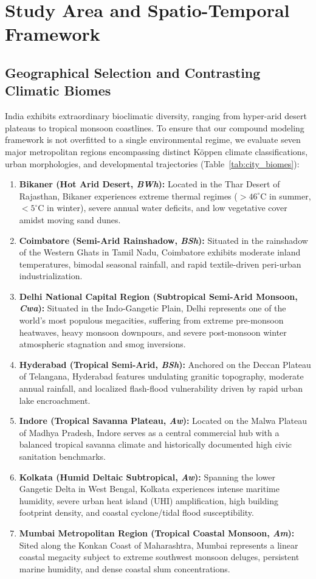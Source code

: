\section{Study Area and Spatio-Temporal Framework}
\label{sec:study_area}

\subsection{Geographical Selection and Contrasting Climatic Biomes}
India exhibits extraordinary bioclimatic diversity, ranging from hyper-arid desert plateaus to tropical monsoon coastlines. To ensure that our compound modeling framework is not overfitted to a single environmental regime, we evaluate seven major metropolitan regions encompassing distinct K{\"o}ppen climate classifications, urban morphologies, and developmental trajectories (Table~\ref{tab:city_biomes}):

\begin{enumerate}
    \item \textbf{Bikaner (Hot Arid Desert, \textit{BWh}):} Located in the Thar Desert of Rajasthan, Bikaner experiences extreme thermal regimes ($>46^\circ\text{C}$ in summer, $<5^\circ\text{C}$ in winter), severe annual water deficits, and low vegetative cover amidst moving sand dunes.
    \item \textbf{Coimbatore (Semi-Arid Rainshadow, \textit{BSh}):} Situated in the rainshadow of the Western Ghats in Tamil Nadu, Coimbatore exhibits moderate inland temperatures, bimodal seasonal rainfall, and rapid textile-driven peri-urban industrialization.
    \item \textbf{Delhi National Capital Region (Subtropical Semi-Arid Monsoon, \textit{Cwa}):} Situated in the Indo-Gangetic Plain, Delhi represents one of the world's most populous megacities, suffering from extreme pre-monsoon heatwaves, heavy monsoon downpours, and severe post-monsoon winter atmospheric stagnation and smog inversions.
    \item \textbf{Hyderabad (Tropical Semi-Arid, \textit{BSh}):} Anchored on the Deccan Plateau of Telangana, Hyderabad features undulating granitic topography, moderate annual rainfall, and localized flash-flood vulnerability driven by rapid urban lake encroachment.
    \item \textbf{Indore (Tropical Savanna Plateau, \textit{Aw}):} Located on the Malwa Plateau of Madhya Pradesh, Indore serves as a central commercial hub with a balanced tropical savanna climate and historically documented high civic sanitation benchmarks.
    \item \textbf{Kolkata (Humid Deltaic Subtropical, \textit{Aw}):} Spanning the lower Gangetic Delta in West Bengal, Kolkata experiences intense maritime humidity, severe urban heat island (UHI) amplification, high building footprint density, and coastal cyclone/tidal flood susceptibility.
    \item \textbf{Mumbai Metropolitan Region (Tropical Coastal Monsoon, \textit{Am}):} Sited along the Konkan Coast of Maharashtra, Mumbai represents a linear coastal megacity subject to extreme southwest monsoon deluges, persistent marine humidity, and dense coastal slum concentrations.
\end{enumerate}

